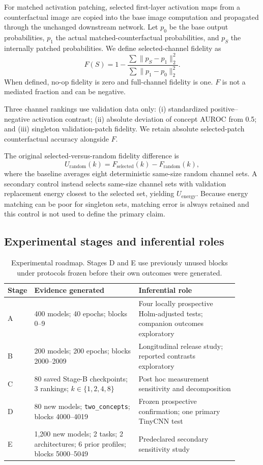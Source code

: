 \documentclass[10pt]{article}
\begin{document}
For matched activation patching, selected first-layer activation maps from a counterfactual image are copied into the base image computation and propagated through the unchanged downstream network. Let $p_0$ be the base output probabilities, $p_1$ the actual matched-counterfactual probabilities, and $p_S$ the internally patched probabilities. We define selected-channel fidelity as
\[
F(S)=1-\frac{\sum\lVert p_S-p_1\rVert_2^2}
{\sum\lVert p_1-p_0\rVert_2^2}.
\]
When defined, no-op fidelity is zero and full-channel fidelity is one. $F$ is not a mediated fraction and can be negative.

Three channel rankings use validation data only: (i) standardized positive--negative activation contrast; (ii) absolute deviation of concept AUROC from 0.5; and (iii) singleton validation-patch fidelity. We retain absolute selected-patch counterfactual accuracy alongside $F$.

The original selected-versus-random fidelity difference is
\[
U_{\mathrm{random}}(k)=F_{\mathrm{selected}}(k)-F_{\mathrm{random}}(k),
\]
where the baseline averages eight deterministic same-size random channel sets. A secondary control instead selects same-size channel sets with validation replacement energy closest to the selected set, yielding $U_{\mathrm{energy}}$. Because energy matching can be poor for singleton sets, matching error is always retained and this control is not used to define the primary claim.

\subsection{Experimental stages and inferential roles}\label{sec:stages}

\begin{table}[t]
\caption{Experimental roadmap. Stages D and E use previously unused blocks under protocols frozen before their own outcomes were generated.}
\label{tab:stages}
\centering
\footnotesize
\setlength{\tabcolsep}{4pt}
\begin{tabular}{@{}lp{0.46\linewidth}p{0.44\linewidth}@{}}
\toprule
Stage & Evidence generated & Inferential role \\
\midrule
A & 400 models; 40 epochs; blocks 0--9 & Four locally prospective Holm-adjusted tests; companion outcomes exploratory \\
B & 200 models; 200 epochs; blocks 2000--2009 & Longitudinal release study; reported contrasts exploratory \\
C & 80 saved Stage-B checkpoints; 3 rankings; $k\in\{1,2,4,8\}$ & Post hoc measurement sensitivity and decomposition \\
D & 80 new models; \texttt{two\_concepts}; blocks 4000--4019 & Frozen prospective confirmation; one primary TinyCNN test \\
E & 1,200 new models; 2 tasks; 2 architectures; 6 prior profiles; blocks 5000--5049 & Predeclared secondary sensitivity study \\
\bottomrule
\end{tabular}
\end{table}
\end{document}
